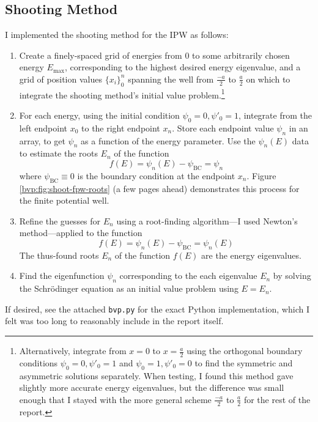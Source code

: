 \documentclass[11pt, a4paper]{article}
\newcommand{\schro}{Schr\"{o}dinger\xspace}
\begin{document}
\subsection{Shooting Method}\label{bvp:ss:shooting}
I implemented the shooting method for the IPW as follows:
\begin{enumerate}
	\item Create a finely-spaced grid of energies from $ 0 $ to some arbitrarily chosen energy $ E_{\text{max}} $, corresponding to the highest desired energy eigenvalue, and a grid of position values $ \{x_{i}\}_{0}^{n} $ spanning the well from $ \frac{-a}{2} $ to $ \frac{a}{2} $ on which to integrate the shooting method's initial value problem.\footnote{Alternatively, integrate from $ x = 0 $ to $ x = \frac{a}{2} $ using the orthogonal boundary conditions $ \psi_{0} = 0, \psi'_{0} = 1$ and $ \psi_{0} = 1, \psi'_{0} = 0$ to find the symmetric and asymmetric solutions separately. When testing, I found this method gave slightly more accurate energy eigenvalues, but the difference was small enough that I stayed with the more general scheme $ \frac{-a}{2} $ to $ \frac{a}{2} $ for the rest of the report.}
	
	\item For each energy, using the initial condition $ \psi_{0} = 0, \psi'_{0} = 1 $, integrate from the left endpoint $ x_{0} $ to the right endpoint $ x_{n} $. Store each endpoint value $ \psi_{n} $ in an array, to get $ \psi_{n} $ as a function of the energy parameter. Use the $ \psi_{n}(E) $ data to estimate the roots $ E_{n} $ of the function
	\begin{equation*}
		f(E) = \psi_{n}(E) - \psi_{\text{BC}} = \psi_{n}
	\end{equation*}
	where $ \psi_{\text{BC}} \equiv 0 $ is the boundary condition at the endpoint $ x_{n} $. Figure \ref{bvp:fig:shoot-fpw-roots} (a few pages ahead) demonstrates this process for the finite potential well.
	
	\item Refine the guesses for $ E_{n} $ using a root-finding algorithm---I used Newton's method---applied to the function
	\begin{equation*}
		f(E) = \psi_{n}(E) - \psi_{\text{BC}} = \psi_{n}(E)
	\end{equation*}
	The thus-found roots $ E_{n} $ of the function $ f(E) $ are the energy eigenvalues.
	
	\item Find the eigenfunction $ \psi_{n} $ corresponding to the each eigenvalue $ E_{n} $ by solving the \schro equation as an initial value problem using $ E = E_{n} $. 
\end{enumerate}
If desired, see the attached \texttt{bvp.py} for the exact Python implementation, which I felt was too long to reasonably include in the report itself.
\end{document}
